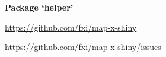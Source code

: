\documentclass[a4paper]{book}
\begin{document}
\chapter*{}
\begin{center}
{\textbf{\huge Package `helper'}}
\par\bigskip{\large \today}
\end{center}
\begin{description}
\raggedright{}
\item[Title]
\item[Version]
\item[Date]
\item[Description]
\item[License]
\item[URL]\AsIs{}\url{https://github.com/fxi/map-x-shiny}\AsIs{}
\item[BugReports]\AsIs{}\url{https://github.com/fxi/map-x-shiny/issues}\AsIs{}
\item[Imports]
\item[RoxygenNote]
\end{description}
\end{document}
